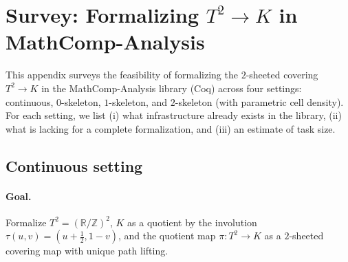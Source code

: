 \documentclass[11pt,a4paper]{article}
\theoremstyle{definition}
\theoremstyle{remark}
\begin{document}
\appendix

\section{Survey: Formalizing \(T^2\to K\) in MathComp-Analysis}
\label{app:mathcomp-survey}

This appendix surveys the feasibility of formalizing the \(2\)-sheeted covering \(T^2\to K\) in the MathComp-Analysis library (Coq) across four settings: continuous, \(0\)-skeleton, \(1\)-skeleton, and \(2\)-skeleton (with parametric cell density). For each setting, we list (i) what infrastructure already exists in the library, (ii) what is lacking for a complete formalization, and (iii) an estimate of task size.

\subsection{Continuous setting}
\label{app:continuous}

\paragraph{Goal.}
Formalize \(T^2=(\mathbb{R}/\mathbb{Z})^2\), \(K\) as a quotient by the involution \(\tau(u,v)=(u+\tfrac12,1-v)\), and the quotient map \(\pi:T^2\to K\) as a \(2\)-sheeted covering map with unique path lifting.
\end{document}
